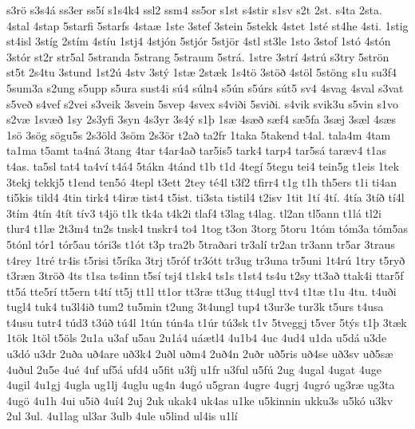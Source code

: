 {s3r^^f6
s3s4^^e1
ss3er
ss5^^ed
s1s4k4
ssl2
ssm4
ss5or
s1st
s4stir
s1sv
s2t
2st.
s4ta
2sta.
4stal
4stap
5starfi
5starfs
4sta^^e6
1ste
3stef
3stein
5stekk
4stet
1st^^e9
st4he
4sti.
1stig
st4isl
3st^^edg
2st^^edm
4st^^edu
1stj4
4stj^^f3n
5stj^^f3r
5stj^^f6r
4stl
st3le
1sto
3stof
1st^^f3
4st^^f3n
3st^^f3r
st2r
str5al
5stranda
5strang
5straum
5str^^e1.
1stre
3str^^ed
4str^^fa
s3try
5str^^f6n
st5t
2s4tu
3stund
1st2^^fa
4stv
3st^^fd
1st^^e6
2st^^e6k
1s4t^^f6
3st^^f6^^f0
4st^^f6l
5st^^f6ng
s1u
su3f4
5sum3a
s2ung
s5upp
s5ura
sust4i
s^^fa4
s^^faln4
s5^^fan
s5^^fars
s^^fat5
sv4
4svag
4sval
s3vat
s5ve^^f0
s4vef
s2vei
s3veik
3svein
5svep
4svex
s4vi^^f0i
5svi^^f0i.
s4vik
svik3u
s5vin
s1vo
s2v^^e6
1sv^^e6^^f0
1sy
2s3yfi
3syn
4s3yr
3s4^^fd
s1^^fe
1s^^e6
4s^^e6^^f0
s^^e6f4
s^^e65fa
3s^^e6j
3s^^e6l
4s^^e6s
1s^^f6
3s^^f6g
s^^f6gu5s
2s3^^f6ld
3s^^f6m
2s3^^f6r
t2a^^f0
ta2fr
1taka
5takend
t4al.
tala4m
4tam
ta1ma
t5amt
ta4n^^e1
3tang
4tar
t4ar4a^^f0
tar5is5
tark4
tarp4
tar5s^^e1
tar^^e6v4
t1as
t4as.
ta5sl
tat4
ta4v^^ed
t4^^e14
5t^^e1kn
4t^^e1nd
t1b
t1d
4teg^^ed
5tegu
tei4
tein5g
t1eis
1tek
3tekj
tekkj5
t1end
ten5^^f3
4tepl
t3ett
2tey
t^^e94l
t3f2
tfirr4
t1g
t1h
th5ers
t1i
ti4an
ti5kis
tild4
4tin
tirk4
t4ir^^e6
tist4
t5ist.
ti3sta
tistil4
t2isv
1tit
1t^^ed
4t^^ed.
4t^^eda
3t^^ed^^f0
t^^ed4l
3t^^edm
4t^^edn
4t^^edt
t^^edv3
t4j^^f6
t1k
tk4a
t4k2i
tlaf4
t3lag
t4lag.
tl2an
tl5ann
t1l^^e1
tl2i
tlur4
t1l^^e6
2t3m4
tn2s
tnsk4
tnskr4
to4
1tog
t3on
3torg
5toru
1t^^f3m
t^^f3m3a
t^^f3m5as
5t^^f3nl
t^^f3r1
t^^f3r5au
t^^f3ri3s
t1^^f3t
t3p
tra2b
5tra^^f0ari
tr3al^^ed
tr2an
tr3ann
tr5ar
3traus
t4rey
1tr^^e9
tr4is
t5risi
t5r^^edka
3trj
t5r^^f3f
tr3^^f3tt
tr3ug
tr3una
tr5uni
1t4r^^fa
1try
t5ry^^f0
t3r^^e6n
3tr^^f6^^f0
4ts
t1sa
ts4inn
t5s^^ed
tsj4
t1sk4
ts1s
t1st4
ts4u
t2sy
tt3a^^f0
ttak4i
ttar5f
tt5^^e1
tte5r^^ed
tt5ern
t4t^^ed
tt5j
tt1l
tt1or
tt3r^^e6
tt3ug
tt4ugl
ttv4
t1t^^e6
t1u
4tu.
t4u^^f0i
tugl4
tuk4
tu3l4i^^f0
tum2
tu5min
t2ung
3t4ungl
tup4
t3ur3e
tur3k
t5urs
t4usa
t4usu
tutr4
t^^fad3
t3^^fa^^f0
t^^fa4l
1t^^fan
t^^fan4a
t1^^far
t^^fa3sk
t1v
5tveggj
t5ver
5t^^fds
t1^^fe
3t^^e6k
1t^^f6k
1t^^f6l
t5^^f6ls
2u1a
u3af
u5au
2u1^^e14
u^^e1^^e6tl4
4u1b4
4uc
4ud4
u1da
u5d^^e1
u3de
u3d^^f3
u3dr
2u^^f0a
u^^f04are
u^^f03k4
2u^^f0l
u^^f0m4
2u^^f04n
2u^^f0r
u^^f05ris
u^^f04se
u^^f03sv
u^^f05s^^e6
4u^^f0ul
2u5e
4u^^e9
4uf
uf5^^e1
ufd4
u5fit
u3fj
u1fr
u3ful
u5f^^fa
2ug
4ugal
4ugat
4uge
4ugil
4u1gj
4ugla
ug1lj
4uglu
ug4n
4ug^^f3
u5gran
4ugre
4ugrj
4ugr^^f3
ug3r^^e6
ug3ta
4ug^^f6
4u1h
4ui
u5i^^f0
4u^^ed4
2uj
2uk
ukak4
uk4as
u1ke
u5kinnin
ukku3s
u5k^^f3
u3kv
2ul
3ul.
4u1lag
ul3ar
3ulb
4ule
u5lind
ul4is
u1l^^ed
}
